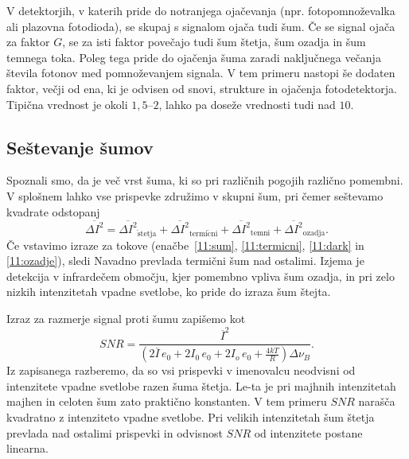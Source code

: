 \begin{remark}
 V detektorjih, v katerih pride do notranjega ojačevanja
 (npr. fotopomnoževalka
  ali plazovna fotodioda),
 se skupaj s signalom ojača tudi šum. Če se signal ojača za faktor $G$, se za isti faktor
 povečajo tudi šum štetja, šum ozadja in šum temnega toka. Poleg tega pride do ojačenja šuma
 zaradi naključnega večanja števila fotonov med pomnoževanjem signala. V tem primeru nastopi
 še dodaten faktor, večji od ena, ki je odvisen od snovi, strukture in ojačenja fotodetektorja. 
 Tipična vrednost je okoli $1,5$--$2$, lahko pa doseže vrednosti tudi nad $10$.
\end{remark}

\subsection*{Seštevanje šumov}
Spoznali smo, da je več vrst šuma, ki so pri različnih pogojih različno pomembni.
V splošnem lahko vse prispevke združimo v skupni šum, pri čemer seštevamo kvadrate
odstopanj
\begin{equation}
\overline{\Delta I^2} = \overline{\Delta I^2}_{\mathrm{\check{s}tetja}} + 
\overline{\Delta I^2}_{\mathrm{termi\check{c}ni}} + \overline{\Delta I^2}_{\mathrm{temni}} + 
\overline{\Delta I^2}_{\mathrm{ozadja}}.
\end{equation}
Če vstavimo izraze za tokove (enačbe~\ref{11:sum}, \ref{11:termicni}, \ref{11:dark}
in \ref{11:ozadje}), sledi
Navadno prevlada termični šum nad ostalimi. Izjema je detekcija v
infrardečem območju, kjer pomembno vpliva šum ozadja, in pri zelo nizkih intenzitetah 
vpadne svetlobe, ko pride do izraza šum štejta. 

Izraz za razmerje signal proti šumu zapišemo kot
\begin{equation}
SNR = \frac{\overline{I}^2}{\left( 2 \overline{I}\,e_0 + 2 I_0\,e_0
+ 2 I_o\,e_0 + \frac{4 kT}{R} \right) \Delta\nu_B}.
\end{equation}
Iz zapisanega razberemo, da so vsi prispevki v imenovalcu neodvisni od intenzitete vpadne svetlobe
razen šuma štetja. Le-ta je pri majhnih intenzitetah majhen in celoten šum 
zato praktično konstanten. V tem primeru $SNR$ narašča kvadratno z intenziteto
vpadne svetlobe. Pri velikih intenzitetah šum štetja prevlada nad ostalimi prispevki
in odvisnost $SNR$ od intenzitete postane linearna. 

